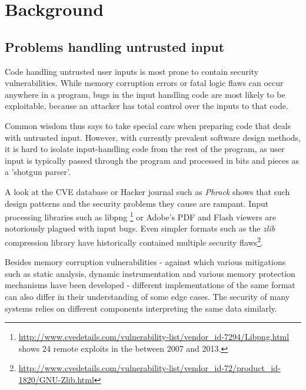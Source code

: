 \section{Background}




\subsection{Problems handling untrusted input}
Code handling untrusted user inputs is most prone to contain security vulnerabilities. While memory
corruption errors or fatal logic flaws can occur anywhere in a program, bugs in the input handling
code are most likely to be exploitable, because an attacker has total control over the inputs to
that code. 

Common wisdom thus says to take special care when preparing code that deals with untrusted input.
However, with currently prevalent software design methods, it is hard to isolate input-handling code
from the rest of the program, as user input is typically passed through the program and processed in
bits and pieces as a 'shotgun parser'\cite{shotgun-parser}.  

A look at the CVE database or Hacker journal such as \textit{Phrack} shows that such design patterns
and the security problems they cause are rampant. Input processing libraries such as libpng
\footnote{\url{http://www.cvedetails.com/vulnerability-list/vendor_id-7294/Libpng.html} shows 24
remote exploits in the between 2007 and 2013.} or Adobe's PDF and Flash viewers are notoriously
plagued with input bugs. Even simpler formats such as the \textit{zlib} compression library have
historically contained multiple security
flaws\footnote{\url{http://www.cvedetails.com/vulnerability-list/vendor_id-72/product_id-1820/GNU-Zlib.html}}.

Besides memory corruption vulnerabilities - against which various mitigations such as static
analysis, dynamic instrumentation and various memory protection mechanisms have been developed -
different implementations of the same format can also differ in their understanding of some edge
cases. The security of many systems relies on different components interpreting the same data
similarly.

